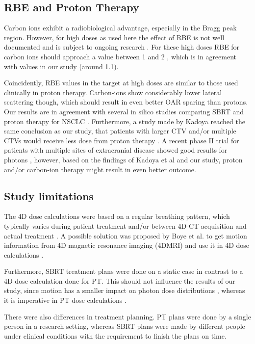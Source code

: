 \subsection{RBE and Proton Therapy}

Carbon ions exhibit a radiobiological advantage, especially in the Bragg peak region. However, for high doses as used here the effect of RBE is not well documented and is subject to ongoing research \cite{Friedrich2014}. 
For these high doses RBE for carbon ions should approach a value between 1 and 2 \cite{Carabe2007}, which is in agreement with values in our study (around 1.1).

Coincidently, RBE values in the target at high doses are similar to those used clinically in proton therapy. Carbon-ions show considerably lower lateral scattering though, which should result in even better 
OAR sparing than protons. Our results are in agreement with several in silico studies comparing SBRT and proton therapy for NSCLC \cite{Roelofs2012, Kadoya2010, Register2010}. 
Furthermore, a study made by Kadoya reached the same conclusion as our study, that patients with larger CTV and/or multiple CTVs would  receive less dose from proton therapy \cite{Kadoya2010}.
A recent phase II trial for patients with multiple sites of extracranial disease showed good results for photons \cite{Iyengar2014}, however, based on the findings of Kadoya et al and our study, 
proton and/or carbon-ion therapy might result in even better outcome. 



\subsection{Study limitations}


The 4D dose calculations were based on a regular breathing pattern, which typically varies during patient treatment and/or between 4D-CT acquisition and actual treatment \cite{Verma2010, Malinowski2011}. 
A possible solution was proposed by Boye et al. to get motion information from 4D magnetic resonance imaging (4DMRI) and use it in 4D dose calculations \cite{Boye2013}.

Furthermore, SBRT treatment plans were done on a static case in contrast to a 4D dose calculation done for PT. This should not influence the results of our study, 
since motion has a smaller impact on photon dose distributions \cite{Zou2014}, whereas it is imperative in PT dose calculations \cite{Bert2011}. 

There were also differences in treatment planning. PT plans were done by a single person in a research setting, whereas SBRT plans were made by different people under clinical conditions with the requirement to finish the plans on time. 

